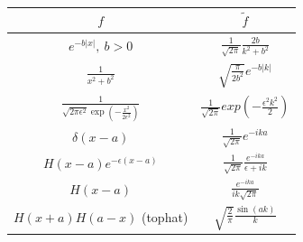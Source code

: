 \documentclass{article}
\theoremstyle{remark}
\theoremstyle{remark}
\begin{document}
    \begin{center}
        \begin{tabular}{|c|c|}
            \hline
            $f$ & $\tilde{f}$\\
            \hline
            $e^{-b|x|},\ b>0$ & $\frac{1}{\sqrt{2\pi}}\frac{2b}{k^2+b^2}$\\
            \hline
            $\frac{1}{x^2+b^2} $ & $\sqrt{\frac{\pi}{2b^2}}e^{-b|k|} $\\
            \hline
            $\frac{1}{\sqrt{2\pi\epsilon^2}\exp\left(-\frac{x^2}{2\epsilon^2}\right)}$ & $\frac{1}{\sqrt{2\pi}}exp\left(-\frac{\epsilon^2k^2}{2}\right) $\\
            \hline
            $\delta(x-a) $ & $\frac{1}{\sqrt{2\pi}}e^{-ika} $\\
            \hline
            $H(x-a)e^{-\epsilon(x-a)} $ & $\frac{1}{\sqrt{2\pi}}\frac{e^{-ika}}{\epsilon+ik} $\\
            \hline
            $H(x-a) $ & $\frac{e^{-ika}}{ik\sqrt{2\pi}} $\\
            \hline
            $H(x+a)H(a-x) $ (tophat) & $\sqrt{\frac{2}{\pi}}\frac{\sin (ak)}{k} $\\
            \hline

        \end{tabular}
    \end{center}
\end{document}
